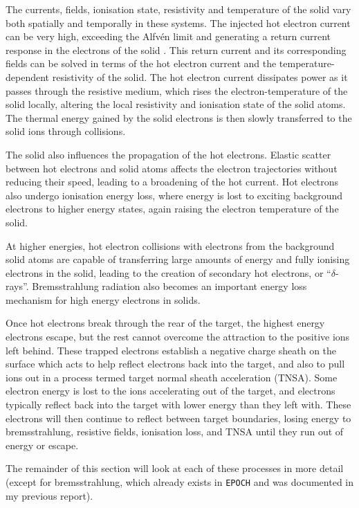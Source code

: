 \documentclass[12pt]{article}
\numberwithin{equation}{section}
\begin{document}
The currents, fields, ionisation state, resistivity and temperature of the solid vary both spatially and temporally in these systems. The injected hot electron current can be very high, exceeding the Alfv\'en limit and generating a return current response in the electrons of the solid \cite{intro:returnCur:Hammer}. This return current and its corresponding fields can be solved in terms of the hot electron current and the temperature-dependent resistivity of the solid. The hot electron current dissipates power as it passes through the resistive medium, which rises the electron-temperature of the solid locally, altering the local resistivity and ionisation state of the solid atoms. The thermal energy gained by the solid electrons is then slowly transferred to the solid ions through collisions.

The solid also influences the propagation of the hot electrons. Elastic scatter between hot electrons and solid atoms affects the electron trajectories without reducing their speed, leading to a broadening of the hot current. Hot electrons also undergo ionisation energy loss, where energy is lost to exciting background electrons to higher energy states, again raising the electron temperature of the solid. 

At higher energies, hot electron collisions with electrons from the background solid atoms are capable of transferring large amounts of energy and fully ionising electrons in the solid, leading to the creation of secondary hot electrons, or ``$\delta$-rays''. Bremsstrahlung radiation also becomes an important energy loss mechanism for high energy electrons in solids.

Once hot electrons break through the rear of the target, the highest energy electrons escape, but the rest cannot overcome the attraction to the positive ions left behind. These trapped electrons establish a negative charge sheath on the surface which acts to help reflect electrons back into the target, and also to pull ions out in a process termed target normal sheath acceleration (TNSA). Some electron energy is lost to the ions accelerating out of the target, and electrons typically reflect back into the target with lower energy than they left with. These electrons will then continue to reflect between target boundaries, losing energy to bremsstrahlung, resistive fields, ionisation loss, and TNSA until they run out of energy or escape.

The remainder of this section will look at each of these processes in more detail (except for bremsstrahlung, which already exists in \texttt{EPOCH} and was documented in my previous report).
\end{document}

